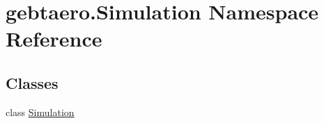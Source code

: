 \hypertarget{namespacegebtaero_1_1_simulation}{}\section{gebtaero.\+Simulation Namespace Reference}
\label{namespacegebtaero_1_1_simulation}
\subsection*{Classes}
\begin{DoxyCompactItemize}
\item 
class \hyperlink{classgebtaero_1_1_simulation_1_1_simulation}{Simulation}
\end{DoxyCompactItemize}
